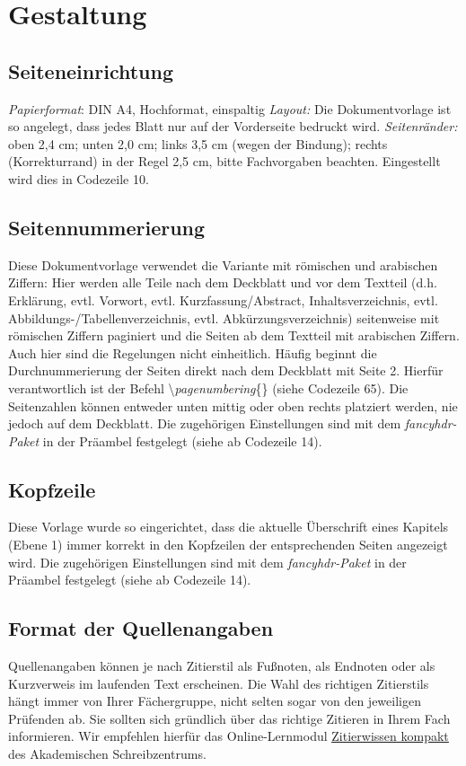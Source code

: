 \documentclass[a4paper,11pt]{article}%
\renewcommand{\\}{\vspace*{0.5\baselineskip} \newline}
\begin{document}
\section{Gestaltung}
\subsection{Seiteneinrichtung}
\textit{Papierformat}: DIN A4, Hochformat, einspaltig \\
\textit{Layout:} Die Dokumentvorlage ist so angelegt, dass jedes Blatt nur auf der Vorderseite bedruckt wird. \\
\textit{Seitenränder:} oben 2,4 cm; unten 2,0 cm; links 3,5 cm (wegen der Bindung); rechts (Korrekturrand) in der Regel 2,5 cm, bitte Fachvorgaben beachten. Eingestellt wird dies in Codezeile 10.

\subsection{Seitennummerierung}
Diese Dokumentvorlage verwendet die Variante mit römischen und arabischen Ziffern: Hier werden alle Teile nach dem Deckblatt und vor dem Textteil (d.h. Erklärung, evtl. Vorwort, evtl. Kurzfassung/Abstract, Inhaltsverzeichnis, evtl. Abbildungs-/Tabellenverzeichnis, evtl. Abkürzungsverzeichnis) seitenweise mit römischen Ziffern paginiert und die Seiten ab dem Textteil mit arabischen Ziffern.\\
Auch hier sind die Regelungen nicht einheitlich. Häufig beginnt die Durchnummerierung der Seiten direkt nach dem Deckblatt mit Seite 2. Hierfür verantwortlich ist der Befehl \textbackslash\textit{pagenumbering}\{\} (siehe Codezeile 65).\\
Die Seitenzahlen können entweder unten mittig oder oben rechts platziert werden, nie jedoch auf dem Deckblatt. Die zugehörigen Einstellungen sind mit dem \textit{fancyhdr-Paket} in der Präambel festgelegt (siehe ab Codezeile 14).

\subsection{Kopfzeile}
Diese Vorlage wurde so eingerichtet, dass die aktuelle Überschrift eines Kapitels (Ebene 1) immer korrekt in den Kopfzeilen der entsprechenden Seiten angezeigt wird. Die zugehörigen Einstellungen sind mit dem \textit{fancyhdr-Paket} in der Präambel festgelegt (siehe ab Codezeile 14).

\subsection{Format der Quellenangaben}
Quellenangaben können je nach Zitierstil als Fußnoten, als Endnoten oder als Kurzverweis im laufenden Text erscheinen. Die Wahl des richtigen Zitierstils hängt immer von Ihrer Fächergruppe, nicht selten sogar von den jeweiligen Prüfenden ab. Sie sollten sich gründlich über das richtige Zitieren in Ihrem Fach informieren. Wir empfehlen hierfür das Online-Lernmodul \href{https://ilias.th-koeln.de/ilias.php?baseClass=ilRepositoryGUI}{\underline{Zitierwissen kompakt}} des Akademischen Schreibzentrums.
\end{document}
